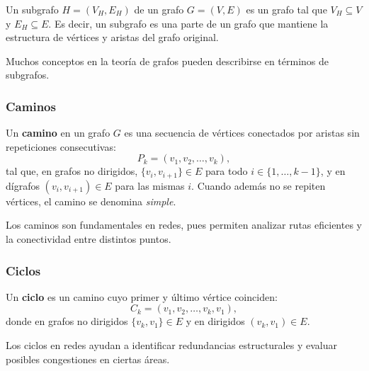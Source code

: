         Un subgrafo $H = (V_H, E_H)$ de un grafo $G = (V, E)$ es un grafo tal que $V_H \subseteq V$ y $E_H \subseteq E$.
        Es decir, un subgrafo es una parte de un grafo que mantiene la estructura de vértices y aristas del grafo original.

        Muchos conceptos en la teoría de grafos pueden describirse en términos de subgrafos.

        \subsubsection{Caminos}

        Un \textbf{camino} en un grafo $G$ es una secuencia de vértices conectados por aristas sin repeticiones consecutivas:
        \begin{equation}
            P_k = (v_1, v_2, \dots, v_k),
        \end{equation}
        tal que, en grafos no dirigidos, $\{v_i, v_{i+1}\} \in E$ para todo $i \in \{1,\dots,k-1\}$, y en dígrafos $(v_i, v_{i+1}) \in E$ para las mismas $i$. Cuando además no se repiten vértices, el camino se denomina \emph{simple}.

        Los caminos son fundamentales en redes, pues permiten analizar rutas eficientes y la conectividad entre distintos puntos.

        \subsubsection{Ciclos}

        Un \textbf{ciclo} es un camino cuyo primer y último vértice coinciden:
        \begin{equation}
            C_k = (v_1, v_2, \dots, v_k, v_1),
        \end{equation}
        donde en grafos no dirigidos $\{v_k, v_1\} \in E$ y en dirigidos $(v_k, v_1) \in E$.

        Los ciclos en redes ayudan a identificar redundancias estructurales y evaluar posibles congestiones en ciertas áreas.

